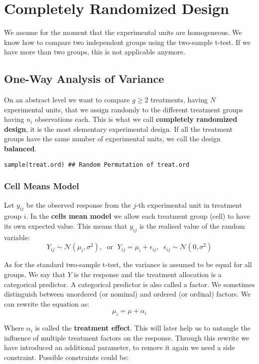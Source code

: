 \section{Completely Randomized Design}

We assume for the moment that the experimental units are homogeneous. We know how to compare two independent groups using the two-sample t-test. If we have more than two groups, this is not applicable anymore.


\subsection{One-Way Analysis of Variance}

On an abstract level we want to compare $g \geq 2$ treatments, having $N$ experimental units, that we assign randomly to the different treatment groups having $n_i$ observations each. This is what we call \textbf{completely randomized design}, it is the most elementary experimental design. If all the treatment groups have the same number of experimental units, we call the design \textbf{balanced}.
\begin{lstlisting}
sample(treat.ord) ## Random Permutation of treat.ord
\end{lstlisting}

\subsubsection{Cell Means Model}

Let $y_{ij}$ be the observed response from the $j$-th experimental unit in treatment group $i$. In the \textbf{cells mean model} we allow each treatment group (cell) to have its own expected value. This means that $y_{ij}$ is the realised value of the random variable:
$$Y_{ij} \sim \mathcal N(\mu_i, \sigma^2), \; \text{ or } \; Y_{ij} = \mu_i + \epsilon_{ij}, \;\; \epsilon_{ij} \sim \mathcal N(0, \sigma^2)$$

As for the standard two-sample t-test, the variance is assumed to be equal for all groups. We say that $Y$ is the response and the treatment allocation is a categorical predictor. A categorical predictor is also called a factor. We sometimes distinguish between unordered (or nominal) and ordered (or ordinal) factors. We can rewrite the equation as:
$$\mu_i = \mu + \alpha_i$$

Where $\alpha_i$ is called the \textbf{treatment effect}. This will later help us to untangle the influence of multiple treatment factors on the response. Through this rewrite we have introduced an additional parameter, to remove it again we need a side constraint. Possible constraints could be:

